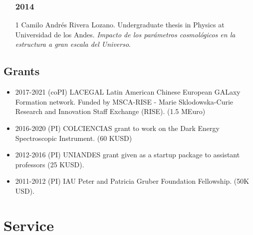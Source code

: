 \documentclass[a4paper,10pt]{article} %
\begin{document}
\begin{itemize}
\subsubsection{2014}
\item[1] Camilo Andr\'es Rivera Lozano. Undergraduate thesis
  in Physics at Universidad de los Andes. \emph{Impacto de los
    par\'ametros cosmol\'ogicos en la 
    estructura a gran escala del Universo}.
\end{itemize}

\subsection{Grants}
\begin{itemize}
\item 2017-2021 (coPI) LACEGAL Latin American Chinese European GALaxy Formation network.
Funded by MSCA-RISE - Marie Sklodowska-Curie Research and Innovation Staff Exchange (RISE). (1.5 MEuro)
\item 2016-2020 (PI) COLCIENCIAS grant to work on the Dark
  Energy Spectroscopic Instrument. (60 KUSD)
\item 2012-2016 (PI) UNIANDES grant given as a startup package to
assistant professors (25 KUSD).
\item 2011-2012 (PI) IAU Peter and Patricia Gruber Foundation
  Fellowship. (50K USD).
\end{itemize}





\color{red}
\section{Service}
\color{black}
\end{document}
